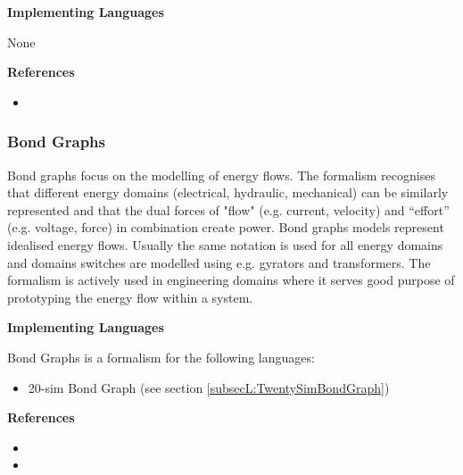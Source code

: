 \textbf{Implementing Languages}

None




\itemCpsUsage {}

\itemCpsUsage {}

\itemCpsUsage {}


\textbf{References}
\begin{itemize}
	
\item {}
\end{itemize}



\subsubsection{Bond Graphs}
\label{subsecF:BondGraphs}


Bond graphs focus on the modelling of energy flows. The formalism recognises that different energy domains (electrical, hydraulic, mechanical) can be similarly represented and that the dual forces of "flow" (e.g. current, velocity) and ``effort'' (e.g. voltage, force) in combination create power. Bond graphs models represent idealised energy flows. Usually the same notation is used for all energy domains and domains switches are modelled using  e.g. gyrators and transformers. The formalism is actively used in engineering domains where it serves good purpose of prototyping the energy flow within a system.

\textbf{Implementing Languages}

Bond Graphs is a formalism for the following languages:
\begin{itemize}
	\item 20-sim Bond Graph (see section \ref{subsecL:TwentySimBondGraph})
\end{itemize}





\textbf{References}
\begin{itemize}
	
\item {}
	
\item {}
\end{itemize}



